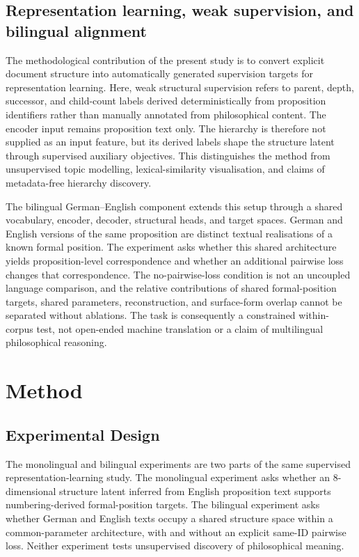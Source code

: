 \documentclass[webpdf,modern,medium,namedate]{oup-authoring-template}
\begin{document}
\subsection{Representation learning, weak supervision, and bilingual alignment}
The methodological contribution of the present study is to convert explicit document structure into automatically generated supervision targets for representation learning. Here, weak structural supervision refers to parent, depth, successor, and child-count labels derived deterministically from proposition identifiers rather than manually annotated from philosophical content. The encoder input remains proposition text only. The hierarchy is therefore not supplied as an input feature, but its derived labels shape the structure latent through supervised auxiliary objectives. This distinguishes the method from unsupervised topic modelling, lexical-similarity visualisation, and claims of metadata-free hierarchy discovery.

The bilingual German--English component extends this setup through a shared vocabulary, encoder, decoder, structural heads, and target spaces. German and English versions of the same proposition are distinct textual realisations of a known formal position. The experiment asks whether this shared architecture yields proposition-level correspondence and whether an additional pairwise loss changes that correspondence. The no-pairwise-loss condition is not an uncoupled language comparison, and the relative contributions of shared formal-position targets, shared parameters, reconstruction, and surface-form overlap cannot be separated without ablations. The task is consequently a constrained within-corpus test, not open-ended machine translation or a claim of multilingual philosophical reasoning.

\section{Method}
\subsection{Experimental Design}
The monolingual and bilingual experiments are two parts of the same supervised representation-learning study. The monolingual experiment asks whether an 8-dimensional structure latent inferred from English proposition text supports numbering-derived formal-position targets. The bilingual experiment asks whether German and English texts occupy a shared structure space within a common-parameter architecture, with and without an explicit same-ID pairwise loss. Neither experiment tests unsupervised discovery of philosophical meaning.
\end{document}
